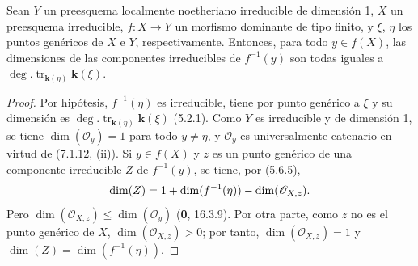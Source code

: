 \begin{corollary}[7.1.13]
\label{IV.2.s7.1.13-fr}
Sean $Y$ un preesquema localmente noetheriano
irreducible de dimensión \textup{1}, $X$ un preesquema
irreducible, $f:X\to Y$ un morfismo dominante de
tipo finito, y $\xi$, $\eta$ los puntos genéricos
de $X$ e $Y$, respectivamente. Entonces, para
todo $y\in f(X)$, las dimensiones de las componentes
irreducibles de $f^{-1}(y)$ son todas iguales a
$\deg.\operatorname{tr}_{\mathbf{k}(\eta)}\boldsymbol{k}(\xi)$.
\end{corollary}

\begin{proof}
Por hipótesis, $f^{-1}(\eta)$ es irreducible, tiene
por punto genérico a $\xi$ y su dimensión es
$\deg.\operatorname{tr}_{\mathbf{k}(\eta)}\boldsymbol{k}(\xi)$ (5.2.1).
Como $Y$ es irreducible y de dimensión 1, se tiene
$\dim(\mathscr O_y)=1$ para todo $y\neq\eta$, y
$\mathscr O_y$ es universalmente catenario en virtud
de (7.1.12, (ii)). Si $y\in f(X)$ y $z$ es un punto
genérico de una componente irreducible $Z$ de
$f^{-1}(y)$, se tiene, por (5.6.5),
\[
\dim(Z)=1+\dim(f^{-1}(\eta))-\dim(\mathscr O_{X,z}).
\]
Pero $\dim(\mathscr O_{X,z})\leqslant\dim(\mathscr O_y)$
(\textbf{0}, 16.3.9). Por otra parte, como $z$ no es el punto
genérico de $X$, $\dim(\mathscr O_{X,z})>0$; por tanto,
$\dim(\mathscr O_{X,z})=1$ y
$\dim(Z)=\dim(f^{-1}(\eta))$.
\end{proof}
